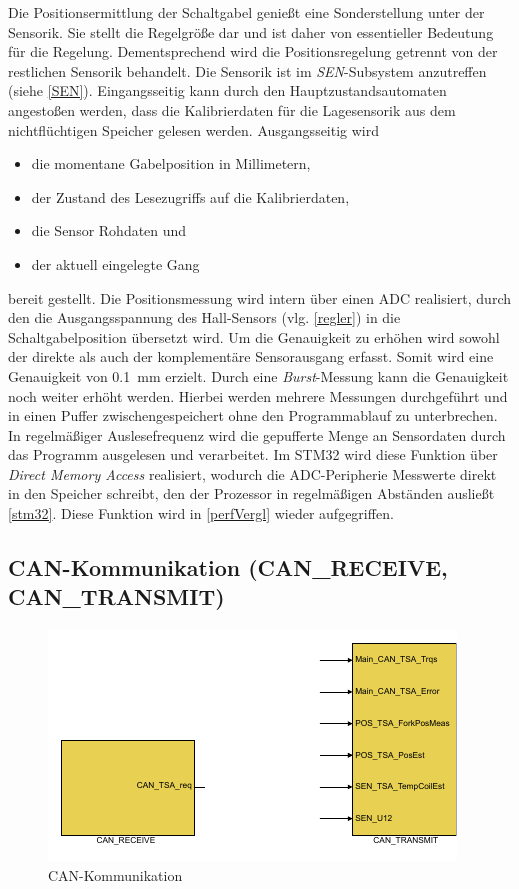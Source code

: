 Die Positionsermittlung der Schaltgabel genießt eine Sonderstellung unter der Sensorik. Sie stellt die Regelgröße dar und ist daher von essentieller Bedeutung für die Regelung.  Dementsprechend wird die Positionsregelung getrennt von der restlichen Sensorik behandelt. Die Sensorik ist im \textit{SEN}-Subsystem anzutreffen (siehe \autoref{SEN}). Eingangsseitig kann durch den Hauptzustandsautomaten angestoßen werden, dass die Kalibrierdaten für die Lagesensorik aus dem nichtflüchtigen Speicher gelesen werden. Ausgangsseitig wird 
\begin{itemize}
	\item die momentane Gabelposition in Millimetern,
	\item der Zustand des Lesezugriffs auf die Kalibrierdaten,
	\item die Sensor Rohdaten und 
	\item der aktuell eingelegte Gang
\end{itemize}
bereit gestellt. 
Die Positionsmessung wird intern über einen ADC realisiert, durch den die Ausgangsspannung des Hall-Sensors (vlg. \autoref{regler}) in die Schaltgabelposition übersetzt wird. Um die Genauigkeit zu erhöhen wird sowohl der direkte als auch der komplementäre Sensorausgang erfasst. Somit wird eine Genauigkeit von \SI{0,1}{mm} erzielt. Durch eine \textit{Burst}-Messung kann die Genauigkeit noch weiter erhöht werden. Hierbei werden mehrere Messungen durchgeführt und in einen Puffer zwischengespeichert ohne den Programmablauf zu unterbrechen. In regelmäßiger Auslesefrequenz wird die gepufferte Menge an Sensordaten durch das Programm ausgelesen und verarbeitet. Im STM32 wird diese Funktion über \textit{Direct Memory Access} realisiert, wodurch die ADC-Peripherie Messwerte direkt in den Speicher schreibt, den der Prozessor in regelmäßigen Abständen ausließt \autoref{stm32}. Diese Funktion wird in \autoref{perfVergl} wieder aufgegriffen.

\subsection{CAN-Kommunikation (CAN\_RECEIVE, CAN\_TRANSMIT)}

\begin{figure}[H]%
\centering
\includegraphics[width=0.6\columnwidth]{./Bilder/fig_can}%
\caption{CAN-Kommunikation}%
\label{fig_can}%
\end{figure}

